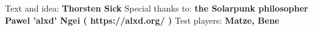 Text and idea: 
\textbf{Thorsten Sick}
Special thanks to: 
\textbf{the Solarpunk philosopher Pawel 'alxd' Ngei ( https://alxd.org/ )}
Test players:
\textbf{Matze, Bene}